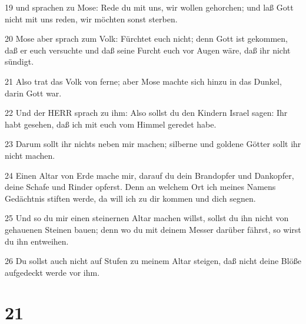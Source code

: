 \par 19 und sprachen zu Mose: Rede du mit uns, wir wollen gehorchen; und laß Gott nicht mit uns reden, wir möchten sonst sterben.
\par 20 Mose aber sprach zum Volk: Fürchtet euch nicht; denn Gott ist gekommen, daß er euch versuchte und daß seine Furcht euch vor Augen wäre, daß ihr nicht sündigt.
\par 21 Also trat das Volk von ferne; aber Mose machte sich hinzu in das Dunkel, darin Gott war.
\par 22 Und der HERR sprach zu ihm: Also sollst du den Kindern Israel sagen: Ihr habt gesehen, daß ich mit euch vom Himmel geredet habe.
\par 23 Darum sollt ihr nichts neben mir machen; silberne und goldene Götter sollt ihr nicht machen.
\par 24 Einen Altar von Erde mache mir, darauf du dein Brandopfer und Dankopfer, deine Schafe und Rinder opferst. Denn an welchem Ort ich meines Namens Gedächtnis stiften werde, da will ich zu dir kommen und dich segnen.
\par 25 Und so du mir einen steinernen Altar machen willst, sollst du ihn nicht von gehauenen Steinen bauen; denn wo du mit deinem Messer darüber fährst, so wirst du ihn entweihen.
\par 26 Du sollst auch nicht auf Stufen zu meinem Altar steigen, daß nicht deine Blöße aufgedeckt werde vor ihm.

\chapter{21}

